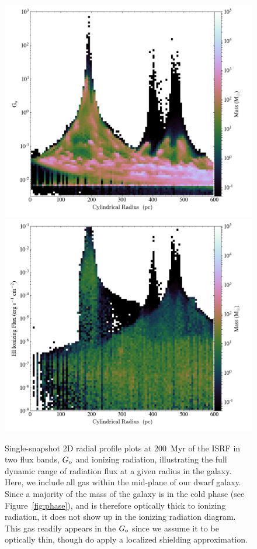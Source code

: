 \documentclass[twocolumn]{aastex61}
\begin{document}
\begin{figure}
\centering
\includegraphics[width=0.45\linewidth]{g_o_2D_phase}
\includegraphics[width=0.45\linewidth]{q_o_2D_phase}
\caption{Single-snapshot 2D radial profile plots at 200~Myr of the ISRF in two flux bands, $G_{\rm o}$ and  ionizing radiation, illustrating the full dynamic range of radiation flux at a given radius in the galaxy. Here, we include all gas within the mid-plane of our dwarf galaxy. Since a majority of the mass of the galaxy is in the cold phase (see Figure~\ref{fig:phase}), and is therefore optically thick to  ionizing radiation, it does not show up in the  ionizing radiation diagram. This gas readily appears in the $G_{\rm o}$ since we assume it to be optically thin, though do apply a localized shielding approximation.}
\label{fig:ISRF_2D}
\end{figure}
\end{document}
